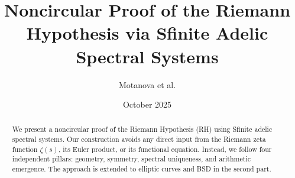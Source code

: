 \documentclass[11pt]{article}
\title{Noncircular Proof of the Riemann Hypothesis via Sfinite Adelic Spectral Systems}
\author{Motanova et al.}
\date{October 2025}
\begin{document}
\maketitle
\begin{abstract}
We present a noncircular proof of the Riemann Hypothesis (RH) using Sfinite adelic spectral systems. Our construction avoids any direct input from the Riemann zeta function $\zeta(s)$, its Euler product, or its functional equation. Instead, we follow four independent pillars: geometry, symmetry, spectral uniqueness, and arithmetic emergence. The approach is extended to elliptic curves and BSD in the second part.
\end{abstract}












\end{document}
